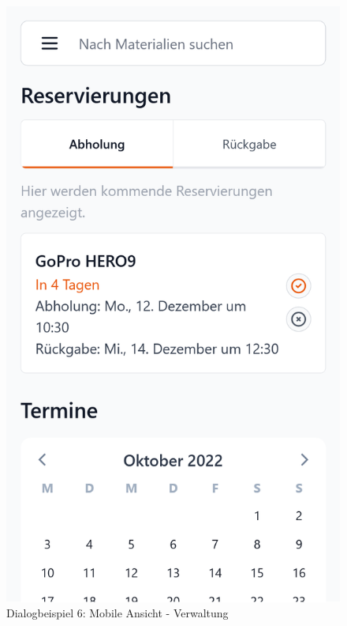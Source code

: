 \begin{figure}[p]
    \centering
    \includegraphics[scale=0.17]{Bilder/Dialgobeispiel/Reservierung Abholung.png}
    \caption{Dialogbeispiel 6: Mobile Ansicht - Verwaltung}
    \label{fig:georg2}
\end{figure}

